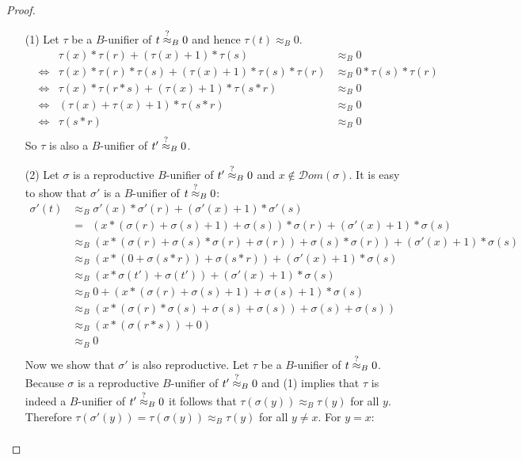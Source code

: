 		\begin{proof}\mbox{}
		\begin{itemize}
		\item[(1)] Let $\tau$ be a $B$-unifier of $t\stackrel{?}{\approx}_B0$ and hence $\tau(t)\approx_B0$.
		\begin{align*}
		&&\tau(x)*\tau(r)+(\tau(x)+1)*\tau(s)&\approx_B0\\
		&\iff&\tau(x)*\tau(r)*\tau(s)+(\tau(x)+1)*\tau(s)*\tau(r)&\approx_B0*\tau(s)*\tau(r)\\
		&\iff&\tau(x)*\tau(r*s)+(\tau(x)+1)*\tau(s*r)&\approx_B0\\
		&\iff&(\tau(x)+\tau(x)+1)*\tau(s*r)&\approx_B0\\
		&\iff&\tau(s*r)&\approx_B0\\
		\end{align*}
		So $\tau$ is also a $B$-unifier of $t'\stackrel{?}{\approx}_B0$.
		\item[(2)] Let $\sigma$ is a reproductive $B$-unifier of $t'\stackrel{?}{\approx}_B0$ and $x\notin\mathcal{D}om(\sigma)$. It is easy to show that $\sigma'$ is a $B$-unifier of $t\stackrel{?}{\approx}_B0$:
		\begin{align*}
		\sigma'(t)&\approx_B\sigma'(x)*\sigma'(r)+(\sigma'(x)+1)*\sigma'(s)\\
		&=\ \ (x*(\sigma(r)+\sigma(s)+1)+\sigma(s))*\sigma(r)+(\sigma'(x)+1)*\sigma(s)\\
		&\approx_B(x*(\sigma(r)+\sigma(s)*\sigma(r)+\sigma(r))+\sigma(s)*\sigma(r))+(\sigma'(x)+1)*\sigma(s)\\
		&\approx_B(x*(0+\sigma(s*r))+\sigma(s*r))+(\sigma'(x)+1)*\sigma(s)\\
		&\approx_B(x*\sigma(t')+\sigma(t'))+(\sigma'(x)+1)*\sigma(s)\\
		&\approx_B0+(x*(\sigma(r)+\sigma(s)+1)+\sigma(s)+1)*\sigma(s)\\
		&\approx_B(x*(\sigma(r)*\sigma(s)+\sigma(s)+\sigma(s))+\sigma(s)+\sigma(s))\\
		&\approx_B(x*(\sigma(r*s))+0)\\
		&\approx_B0\\
		\end{align*}
		Now we show that $\sigma'$ is also reproductive. Let $\tau$ be a $B$-unifier of $t\stackrel{?}{\approx}_B0$. Because $\sigma$ is a reproductive $B$-unifier of $t'\stackrel{?}{\approx}_B0$ and (1) implies that $\tau$ is indeed a $B$-unifier of $t'\stackrel{?}{\approx}_B0$ it follows that $\tau(\sigma(y))\approx_B\tau(y)$ for all $y$. Therefore $\tau(\sigma'(y))=\tau(\sigma(y))\approx_B\tau(y)$ for all $y\neq x$. For $y=x$:
		\begin{align*}

\end{align*}
\end{itemize}
\end{proof}
